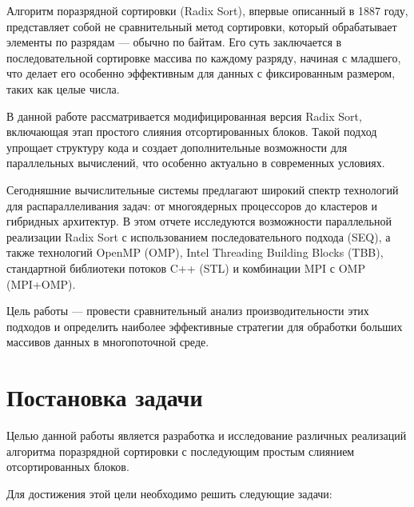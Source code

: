 \documentclass[12pt]{article}
\begin{document}
Алгоритм поразрядной сортировки (Radix Sort), впервые описанный в 1887 году, представляет собой не сравнительный метод сортировки, который обрабатывает элементы по разрядам — обычно по байтам. Его суть заключается в последовательной сортировке массива по каждому разряду, начиная с младшего, что делает его особенно эффективным для данных с фиксированным размером, таких как целые числа. 

В данной работе рассматривается модифицированная версия Radix Sort, включающая этап простого слияния отсортированных блоков. Такой подход упрощает структуру кода и создает дополнительные возможности для параллельных вычислений, что особенно актуально в современных условиях.

Сегодняшние вычислительные системы предлагают широкий спектр технологий для распараллеливания задач: от многоядерных процессоров до кластеров и гибридных архитектур. В этом отчете исследуются возможности параллельной реализации Radix Sort с использованием последовательного подхода (SEQ), а также технологий OpenMP (OMP), Intel Threading Building Blocks (TBB), стандартной библиотеки потоков C++ (STL) и комбинации MPI с OMP (MPI+OMP).

Цель работы — провести сравнительный анализ производительности этих подходов и определить наиболее эффективные стратегии для обработки больших массивов данных в многопоточной среде.

\section{Постановка задачи}

\hspace*{1.25em}Целью данной работы является разработка и исследование различных реализаций алгоритма поразрядной сортировки с последующим простым слиянием отсортированных блоков.

Для достижения этой цели необходимо решить следующие задачи:
\end{document}
